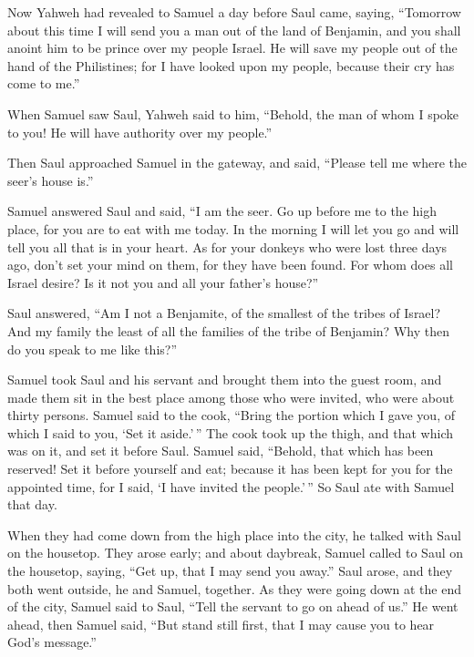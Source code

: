  Now Yahweh had revealed to Samuel a day before Saul came,
saying,  ``Tomorrow about this time I will send you a man
out of the land of Benjamin, and you shall anoint him to be prince over
my people Israel. He will save my people out of the hand of the
Philistines; for I have looked upon my people, because their cry has
come to me.''

 When Samuel saw Saul, Yahweh said to him, ``Behold, the
man of whom I spoke to you! He will have authority over my people.''

 Then Saul approached Samuel in the gateway, and said,
``Please tell me where the seer's house is.''

 Samuel answered Saul and said, ``I am the seer. Go up
before me to the high place, for you are to eat with me today. In the
morning I will let you go and will tell you all that is in your heart.
 As for your donkeys who were lost three days ago, don't
set your mind on them, for they have been found. For whom does all
Israel desire? Is it not you and all your father's house?''

 Saul answered, ``Am I not a Benjamite, of the smallest of
the tribes of Israel? And my family the least of all the families of the
tribe of Benjamin? Why then do you speak to me like this?''

 Samuel took Saul and his servant and brought them into the
guest room, and made them sit in the best place among those who were
invited, who were about thirty persons.  Samuel said to the
cook, ``Bring the portion which I gave you, of which I said to you, `Set
it aside.'\,''  The cook took up the thigh, and that which
was on it, and set it before Saul. Samuel said, ``Behold, that which has
been reserved! Set it before yourself and eat; because it has been kept
for you for the appointed time, for I said, `I have invited the
people.'\,'' So Saul ate with Samuel that day.

 When they had come down from the high place into the city,
he talked with Saul on the housetop.  They arose early; and
about daybreak, Samuel called to Saul on the housetop, saying, ``Get up,
that I may send you away.'' Saul arose, and they both went outside, he
and Samuel, together.  As they were going down at the end
of the city, Samuel said to Saul, ``Tell the servant to go on ahead of
us.'' He went ahead, then Samuel said, ``But stand still first, that I
may cause you to hear God's message.''

